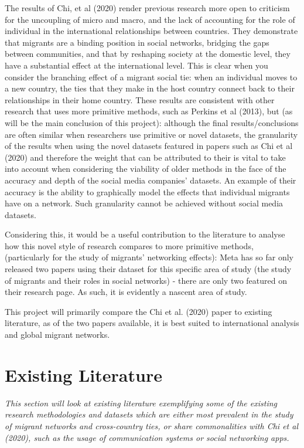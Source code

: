 \documentclass[12pt]{article}
\begin{document}
The results of Chi, et al (2020) render previous research more open to criticism for the 
uncoupling of micro and macro, and the lack of accounting for the role of individual in 
the international relationships between countries. They demonstrate that migrants are a 
binding position in social networks, bridging the gaps between communities, and that by 
reshaping society at the domestic level, they have a substantial effect at the international 
level. This is clear when you consider the branching effect of a migrant social tie: 
when an individual moves 
to a new country, the ties that they make in the host country connect back to their relationships 
in their home country. These results are consistent with other research 
that uses more primitive methods, such as Perkins et al (2013), but (as will be the main 
conclusion of this project): although the final 
results/conclusions are often similar when researchers use primitive or novel datasets, 
the granularity of the results when using the novel datasets featured in papers such as Chi et al (2020) 
and therefore the weight that can be 
attributed to their is vital to take into account 
when considering the viability of older methods in the face of the accuracy and depth of 
the social media companies' datasets.
An example of their accuracy is the ability to graphically model the effects that individual
 migrants have on a network. Such granularity cannot be achieved without social media datasets.

Considering this, it would be a useful contribution to the literature to 
analyse how this novel style of research compares to more primitive methods, (particularly 
for the study of migrants' networking effects): Meta has so far 
only released two papers using their dataset for this specific area of study
(the study of migrants and their roles in social networks) - there are only two featured on their 
research page. As such, it is evidently a nascent area of study. 

This project will primarily compare the Chi et al. (2020) paper to 
existing literature, as of the two papers available, it is best suited to international 
analysis and global migrant networks. 

\section{Existing Literature}

\textit{
	This section will look at existing literature exemplifying some of the existing 
	research methodologies and datasets which are either most prevalent in the study 
	of migrant networks and cross-country ties, or share commonalities with Chi et al (2020), 
	such as the usage of communication systems or social networking apps.
}
\newline
\end{document}
